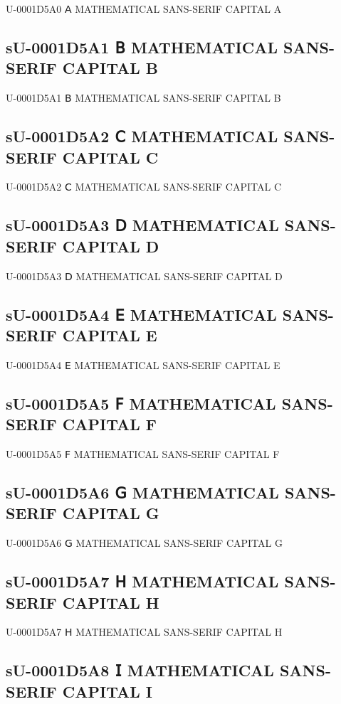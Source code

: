 U-0001D5A0 𝖠 MATHEMATICAL SANS-SERIF CAPITAL A

\subsection{sU-0001D5A1 𝖡 MATHEMATICAL SANS-SERIF CAPITAL B}

U-0001D5A1 𝖡 MATHEMATICAL SANS-SERIF CAPITAL B

\subsection{sU-0001D5A2 𝖢 MATHEMATICAL SANS-SERIF CAPITAL C}

U-0001D5A2 𝖢 MATHEMATICAL SANS-SERIF CAPITAL C

\subsection{sU-0001D5A3 𝖣 MATHEMATICAL SANS-SERIF CAPITAL D}

U-0001D5A3 𝖣 MATHEMATICAL SANS-SERIF CAPITAL D

\subsection{sU-0001D5A4 𝖤 MATHEMATICAL SANS-SERIF CAPITAL E}

U-0001D5A4 𝖤 MATHEMATICAL SANS-SERIF CAPITAL E

\subsection{sU-0001D5A5 𝖥 MATHEMATICAL SANS-SERIF CAPITAL F}

U-0001D5A5 𝖥 MATHEMATICAL SANS-SERIF CAPITAL F

\subsection{sU-0001D5A6 𝖦 MATHEMATICAL SANS-SERIF CAPITAL G}

U-0001D5A6 𝖦 MATHEMATICAL SANS-SERIF CAPITAL G

\subsection{sU-0001D5A7 𝖧 MATHEMATICAL SANS-SERIF CAPITAL H}

U-0001D5A7 𝖧 MATHEMATICAL SANS-SERIF CAPITAL H

\subsection{sU-0001D5A8 𝖨 MATHEMATICAL SANS-SERIF CAPITAL I}

